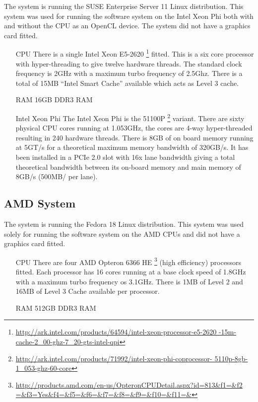 The system is running the SUSE Enterprise Server 11 Linux distribution. This
system was used for running the software system on the Intel Xeon Phi both with
and without the CPU as an OpenCL device. The system did not have a graphics card
fitted.

\begin{itemize}

\item[CPU] There is a single Intel Xeon E5-2620
\footnote{\url{http://ark.intel.com/products/64594/intel-xeon-processor-e5-2620
-15m-cache-2_00-ghz-7_20-gts-intel-qpi}} fitted. This is a six core processor
with hyper-threading to give twelve hardware threads. The standard clock
frequency is 2GHz with a maximum turbo frequency of 2.5Ghz. There is a total of
15MB ``Intel Smart Cache'' available which acts as Level 3 cache.

\item[RAM] 16GB DDR3 RAM

\item[Intel Xeon Phi] The Intel Xeon Phi is the 51100P
\footnote{\url{http://ark.intel.com/products/71992/intel-xeon-phi-coprocessor-
5110p-8gb-1_053-ghz-60-core}} variant. There are sixty physical CPU cores
running at 1.053GHz, the cores are 4-way hyper-threaded resulting in 240
hardware threads. There is 8GB of on board memory running at 5GT/s for a
theoretical maximum memory bandwidth of 320GB/s. It has been installed in a PCIe
2.0 slot with 16x lane bandwidth giving a total theoretical bandwidth between
its on-board memory and main memory of 8GB/s (500MB/ per lane).

\end{itemize}

\subsection{AMD System}

The system is running the Fedora 18 Linux distribution. This system was used
solely for running the software system on the AMD CPUs and did not have a
graphics card fitted.

\begin{itemize}

\item[CPU] There are four AMD Opteron 6366 HE
\footnote{\url{http://products.amd.com/en-us/OpteronCPUDetail.aspx?id=813&f1=&f2
=&f3=Yes&f4=&f5=&f6=&f7=&f8=&f9=&f10=&f11=&}} (high efficiency) processors
fitted. Each processor has 16 cores running at a base clock speed of 1.8GHz with
a maximum turbo frequency os 3.1GHz. There is 1MB of Level 2 and 16MB of Level 3
Cache available per processor.

\item[RAM] 512GB DDR3 RAM

\end{itemize}

